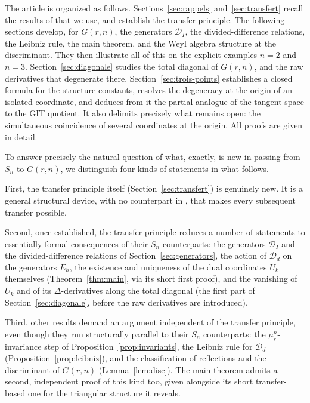 \documentclass[11pt]{article}
\theoremstyle{remark}
\begin{document}
The article is organized as follows. Sections~\ref{sec:rappels} and~\ref{sec:transfert} recall the results of \cite{Ze} that we use, and establish the transfer principle. The following sections develop, for $G(r,n)$, the generators $\mathcal D_I$, the divided-difference relations, the Leibniz rule, the main theorem, and the Weyl algebra structure at the discriminant. They then illustrate all of this on the explicit examples $n=2$ and $n=3$. Section~\ref{sec:diagonale} studies the total diagonal of $G(r,n)$, and the raw derivatives that degenerate there. Section~\ref{sec:trois-points} establishes a closed formula for the structure constants, resolves the degeneracy at the origin of an isolated coordinate, and deduces from it the partial analogue of the tangent space to the GIT quotient. It also delimits precisely what remains open: the simultaneous coincidence of several coordinates at the origin. All proofs are given in detail.

To answer precisely the natural question of what, exactly, is new in passing from $S_n$ to $G(r,n)$, we distinguish four kinds of statements in what follows.

First, the transfer principle itself (Section~\ref{sec:transfert}) is genuinely new. It is a general structural device, with no counterpart in \cite{Ze}, that makes every subsequent transfer possible.

Second, once established, the transfer principle reduces a number of statements to essentially formal consequences of their $S_n$ counterparts: the generators $\mathcal D_I$ and the divided-difference relations of Section~\ref{sec:generators}, the action of $\mathcal D_d$ on the generators $E_h$, the existence and uniqueness of the dual coordinates $U_k$ themselves (Theorem~\ref{thm:main}, via its short first proof), and the vanishing of $U_k$ and of its $\Delta$-derivatives along the total diagonal (the first part of Section~\ref{sec:diagonale}, before the raw derivatives are introduced).

Third, other results demand an argument independent of the transfer principle, even though they run structurally parallel to their $S_n$ counterparts: the $\mu_r^n$-invariance step of Proposition~\ref{prop:invariants}, the Leibniz rule for $\mathcal D_d$ (Proposition~\ref{prop:leibniz}), and the classification of reflections and the discriminant of $G(r,n)$ (Lemma~\ref{lem:disc}). The main theorem admits a second, independent proof of this kind too, given alongside its short transfer-based one for the triangular structure it reveals.
\end{document}
